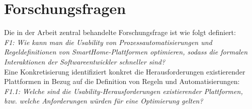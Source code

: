 \section{Forschungsfragen}
\label{sec:forschungsfragen}
    Die in der Arbeit zentral behandelte Forschungsfrage ist wie folgt definiert: 
    \\
    \linebreak
    \textit{F1: Wie kann man die Usability von Prozessautomatisierungen und Regeldefinitionen von SmartHome-Plattformen optimieren, sodass die formalen Interaktionen der Softwareentwickler schneller sind?}
    \\
    \linebreak
    Eine Konkretisierung identifiziert konkret die Herausforderungen existierender Plattformen in Bezug auf die Definition von Regeln und Automatisierungen:
    \\
    \linebreak
    \textit{F1.1: Welche sind die Usability-Herausforderungen existierender Plattformen, bzw. welche Anforderungen würden für eine Optimierung gelten?}


